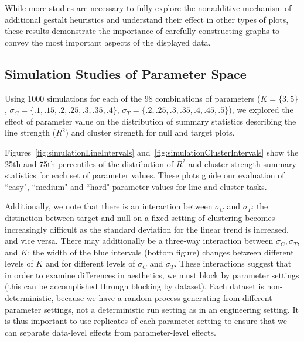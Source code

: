 \documentclass[12pt]{article}\usepackage[]{graphicx}\usepackage[]{color}
\begin{document}
While more studies are necessary to fully explore the nonadditive mechanism of additional gestalt heuristics and understand their effect in other types of plots, these results demonstrate the importance of carefully constructing graphs to convey the most important aspects of the displayed data. 



\newpage
\begin{appendix}
\section{Simulation Studies of Parameter Space}\label{app:parametersimulation}

Using 1000 simulations for each of the 98 combinations of parameters ($K=\{3,5\}$, $\sigma_C=\{.1, .15, .2, .25, .3, .35, .4\}$, $\sigma_T=\{.2, .25, .3, .35, .4, .45, .5\}$), we explored the effect of parameter value on the distribution of summary statistics describing the line strength ($R^2$) and cluster strength for null and target plots. 

Figures~\ref{fig:simulationLineIntervals} and~\ref{fig:simulationClusterIntervals} show the 25th and 75th percentiles of the distribution of $R^2$ and cluster strength summary statistics for each set of parameter values. These plots guide our evaluation of ``easy", ``medium" and ``hard" parameter values for line and cluster tasks. 

Additionally, we note that there is an interaction between $\sigma_C$ and $\sigma_T$: the distinction between target and null on a fixed setting of clustering becomes increasingly difficult as the standard deviation for the linear trend is increased, and vice versa. There may additionally be a three-way interaction between $\sigma_C, \sigma_T$, and $K$: the width of the blue intervals (bottom figure) changes  between different levels of $K$ and for different levels of $\sigma_C$ and $\sigma_T$. These interactions suggest that in order to examine differences in aesthetics, we must block by parameter settings (this can be accomplished through blocking by dataset). Each dataset is non-deterministic, because we have a random process generating from different parameter settings, not a deterministic run setting as in an engineering setting. It is thus important to use replicates of each parameter setting to ensure that we can separate data-level effects from parameter-level effects. 




\end{appendix}
\end{document}
